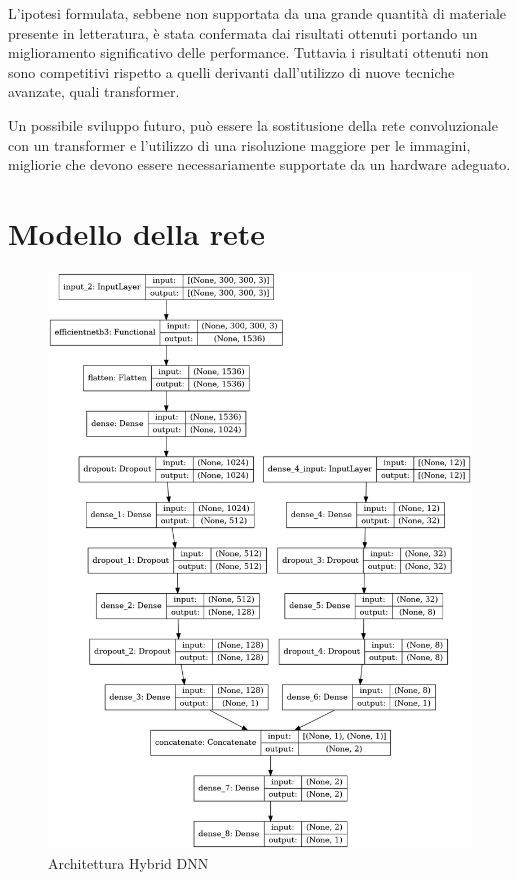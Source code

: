 L'ipotesi formulata, sebbene non supportata da una grande quantità di materiale presente in letteratura, è stata confermata dai risultati ottenuti portando un miglioramento significativo delle performance. Tuttavia i risultati ottenuti non sono competitivi rispetto a quelli derivanti dall'utilizzo di nuove tecniche avanzate, quali transformer.

Un possibile sviluppo futuro, può essere la sostitusione della rete convoluzionale con un transformer e l'utilizzo di una risoluzione maggiore per le immagini, migliorie che devono essere necessariamente supportate da un hardware adeguato.




\appendix
\section{Modello della rete}
\begin{figure}[H]
    \centering
    \includegraphics[scale=0.30]{Plot/Model-Plot.png}
    \caption{Architettura Hybrid DNN}
    \label{fig:model}
\end{figure}

